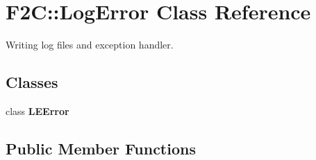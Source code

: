 \hypertarget{class_f2_c_1_1_log_error}{
\section{F2C::LogError Class Reference}
\label{class_f2_c_1_1_log_error}
}


Writing log files and exception handler.  
\subsection*{Classes}
\begin{DoxyCompactItemize}
\item 
class {\bfseries LEError}
\end{DoxyCompactItemize}
\subsection*{Public Member Functions}
